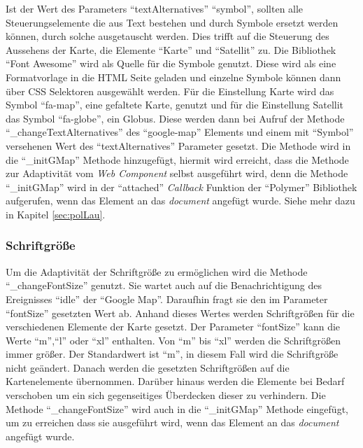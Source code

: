 \documentclass[12pt, paper=a4, bibtotoc, toc=listof, headsepline=true, numbers=endperiod]{scrreprt}
\begin{document}
	\newline
	Ist der Wert des Parameters \enquote{textAlternatives} \enquote{symbol}, sollten alle Steuerungselemente die aus Text bestehen und durch Symbole ersetzt werden können, durch solche ausgetauscht werden. Dies trifft auf die Steuerung des Aussehens der Karte, die Elemente \enquote{Karte} und \enquote{Satellit} zu. Die Bibliothek \enquote{Font Awesome} wird als Quelle für die Symbole genutzt\cite{fonAwe}. Diese wird als eine Formatvorlage in die \ac{HTML} Seite geladen und einzelne Symbole können dann über \ac{CSS} Selektoren ausgewählt werden. Für die Einstellung Karte wird das Symbol \enquote{fa-map}, eine gefaltete Karte, genutzt und für die Einstellung Satellit das Symbol \enquote{fa-globe}, ein Globus. Diese werden dann bei Aufruf der Methode \enquote{\_changeTextAlternatives} des \enquote{google-map} Elements und einem mit \enquote{Symbol} versehenen Wert des \enquote{textAlternatives} Parameter gesetzt. Die Methode wird in die \enquote{\_initGMap} Methode hinzugefügt, hiermit wird erreicht, dass die Methode zur Adaptivität vom \emph{Web Component} selbst ausgeführt wird, denn die Methode \enquote{\_initGMap} wird in der \enquote{attached} \emph{Callback} Funktion der \enquote{Polymer} Bibliothek aufgerufen, wenn das Element an das \emph{document} angefügt wurde. Siehe mehr dazu in Kapitel \ref{sec:polLau}.
	\subsubsection{Schriftgröße}
	\label{sec:fontsize}
	Um die Adaptivität der Schriftgröße zu ermöglichen wird die Methode \enquote{\_changeFontSize} genutzt.  Sie wartet auch auf die Benachrichtigung des Ereignisses \enquote{idle} der \enquote{Google Map}. Daraufhin fragt sie den im Parameter \enquote{fontSize} gesetzten Wert ab. Anhand dieses Wertes werden Schriftgrößen für die verschiedenen Elemente der Karte gesetzt. Der Parameter \enquote{fontSize} kann die Werte \enquote{m},\enquote{l} oder \enquote{xl} enthalten. Von \enquote{m} bis \enquote{xl} werden die Schriftgrößen immer größer. Der Standardwert ist \enquote{m}, in diesem Fall wird die Schriftgröße nicht geändert. Danach werden die gesetzten Schriftgrößen auf die Kartenelemente übernommen. Darüber hinaus werden die Elemente bei Bedarf verschoben um ein sich gegenseitiges Überdecken dieser zu verhindern. Die Methode \enquote{\_changeFontSize} wird auch in die \enquote{\_initGMap} Methode eingefügt, um zu erreichen dass sie ausgeführt wird, wenn das Element an das \emph{document} angefügt wurde.
\end{document}
